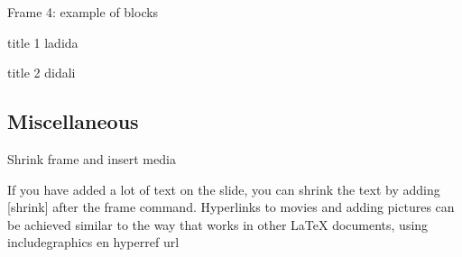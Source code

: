 \documentclass[xcolor=svgnames]{beamer}
\begin{document}

\begin{frame}{Frame 4: example of blocks}
  \begin{block}{title 1}
    ladida
  \end{block}
  \begin{block}{title 2}
  didali
  \end{block}
\end{frame}

\subsection[shorttitlesubsec]{Miscellaneous}

\begin{frame}[shrink]{Shrink frame and insert media}

If you have added a lot of text on the slide, you can shrink the text by adding [shrink] after the frame command.
Hyperlinks to movies and adding pictures can be achieved similar to the way that works in other LaTeX documents, using includegraphics en hyperref url
\end{frame}
\end{document}
